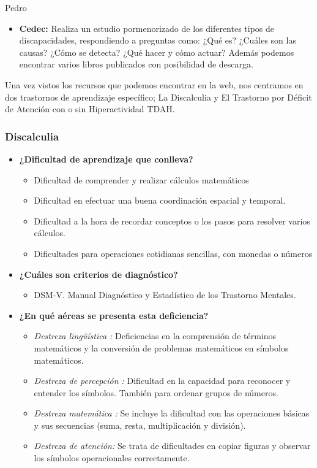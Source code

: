 \begin{opin}{\pedrocolor}{Pedro}
\begin{itemize}
\item \textbf{Cedec:}  Realiza un estudio pormenorizado de los diferentes tipos de discapacidades, respondiendo a preguntas como: ¿Qué es? ¿Cuáles son las causas? ¿Cómo se detecta? ¿Qué hacer y cómo actuar? Además podemos encontrar varios libros publicados con posibilidad de descarga.
\end{itemize}

Una vez vistos los recursos que podemos encontrar en la web, nos centramos en dos trastornos de aprendizaje específico; La Discalculia y El Trastorno por Déficit de Atención con o sin Hiperactividad TDAH.

\subsubsection{Discalculia}

\begin{itemize}
\item \textbf{¿Dificultad de aprendizaje que conlleva?}
\begin{itemize}
\item Dificultad de comprender y realizar cálculos matemáticos
\item Dificultad en efectuar una buena coordinación espacial y temporal.
\item Dificultad a la hora de recordar conceptos o los pasos para resolver varios cálculos.
\item Dificultades para operaciones cotidianas sencillas, con monedas o números 	
\end{itemize}

\item \textbf{¿Cuáles son criterios de diagnóstico?}
\begin{itemize}
\item DSM-V. Manual Diagnóstico y Estadístico de los Trastorno Mentales.
\end{itemize}

\item \textbf{¿En qué aéreas se presenta esta deficiencia?}
\begin{itemize}
\item \textit{Destreza lingüística :} Deficiencias en la comprensión de términos matemáticos y la conversión de problemas matemáticos en símbolos matemáticos.
\item \textit{Destreza de percepción :} Dificultad en la capacidad para reconocer y entender los símbolos. También para ordenar grupos de números.
\item \textit{Destreza matemática :} Se incluye la dificultad con las operaciones básicas y sus secuencias (suma, resta, multiplicación y división).
\item \textit{Destreza de atención:} Se trata de dificultades en copiar figuras y observar los símbolos operacionales correctamente.
\end{itemize}


\end{itemize}
\end{opin}
